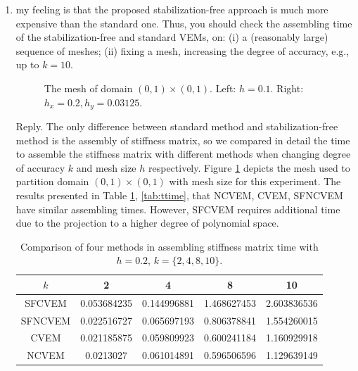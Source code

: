 \documentclass[10pt]{amsart}
\theoremstyle{definition}
\theoremstyle{remark}
\begin{document}
\begin{enumerate}[1.]
\item \textsf{
my feeling is that the proposed stabilization-free approach is much more
expensive than the standard one. Thus, you should check the assembling time
of the stabilization-free and standard VEMs, on: (i) a (reasonably large)
sequence of meshes; (ii) fixing a mesh, increasing the degree of accuracy,
e.g., up to $k = 10$.
}
\begin{figure}[h]
\centering
{}
\caption{The mesh of domain $(0, 1)\times(0, 1)$. Left: $h = 0.1$. Right:
$h_x=0.2, h_y = 0.03125$.}
  \label{fig:polymesh} %
\end{figure}

\smallskip \noindent \textcolor[rgb]{1.00,0.00,0.00}{Reply.}
The only difference between standard method and stabilization-free method is the
assembly of stiffness matrix,
so we compared in detail the time to assemble the stiffness matrix with
different methods when changing degree of accuracy $k$ and mesh size $h$
respectively. Figure \ref{fig:polymesh} depicts the mesh used to partition domain 
$(0, 1)\times(0, 1)$ with mesh size for this experiment.
The results presented in Table
\ref{tab:ptime}, \ref{tab:ttime}, that
NCVEM, CVEM, SFNCVEM have similar assembling times. 
However, SFCVEM requires additional time due to the projection to a higher
degree of polynomial space.

\begin{table}[htbp]
\caption{Comparison of four methods in assembling stiffness matrix time with
 $h=0.2$, $k = \{2, 4, 8, 10\}$.}
\label{tab:ptime}
\centering
\begin{tabular}{c|cccc}
\toprule
$k$ & 2 & 4 & 8 & 10 \\
\hline
SFCVEM & 0.053684235 & 0.144996881 & 1.468627453 & 2.603836536 \\
SFNCVEM & 0.022516727 & 0.065697193 & 0.806378841 & 1.554260015 \\
CVEM & 0.021185875 & 0.059809923 & 0.600241184 & 1.160929918 \\
NCVEM & 0.0213027 & 0.061014891 & 0.596506596 & 1.129639149 \\
\bottomrule
\end{tabular}
\end{table}


\end{enumerate}
\end{document}
